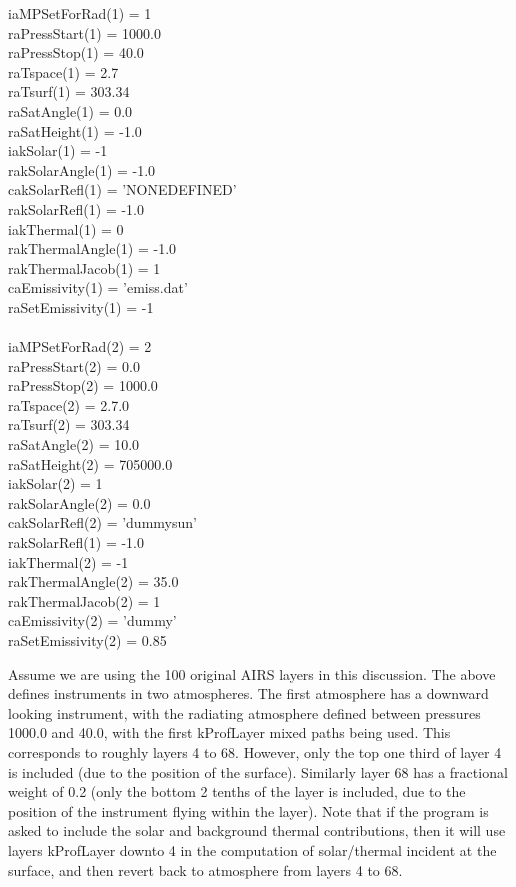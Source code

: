 \documentclass[12pt]{article}
\newcommand{\ttab}{\indent\indent}
\begin{document}
{\medskip
\ttab iaMPSetForRad(1)   = 1\\
\ttab raPressStart(1)    = 1000.0\\
\ttab raPressStop(1)     = 40.0\\
\ttab raTspace(1)        = 2.7\\
\ttab raTsurf(1)         = 303.34\\
\ttab raSatAngle(1)      = 0.0\\
\ttab raSatHeight(1)     = -1.0\\
\ttab iakSolar(1)        = -1\\
\ttab rakSolarAngle(1)   = -1.0\\
\ttab cakSolarRefl(1)    = 'NONEDEFINED'\\
\ttab rakSolarRefl(1)   = -1.0\\
\ttab iakThermal(1)      = 0\\
\ttab rakThermalAngle(1) = -1.0\\
\ttab rakThermalJacob(1) = 1\\
\ttab caEmissivity(1)    = 'emiss.dat'\\
\ttab raSetEmissivity(1) = -1\\
\ttab  \\
\ttab iaMPSetForRad(2)   = 2\\
\ttab raPressStart(2)    = 0.0\\
\ttab raPressStop(2)     = 1000.0\\
\ttab raTspace(2)        = 2.7.0\\
\ttab raTsurf(2)         = 303.34\\
\ttab raSatAngle(2)      = 10.0\\
\ttab raSatHeight(2)     = 705000.0\\
\ttab iakSolar(2)        = 1\\
\ttab rakSolarAngle(2)   = 0.0\\
\ttab cakSolarRefl(2)    = 'dummysun'\\
\ttab rakSolarRefl(1)   = -1.0\\
\ttab iakThermal(2)      = -1\\
\ttab rakThermalAngle(2) = 35.0\\
\ttab rakThermalJacob(2) = 1\\
\ttab caEmissivity(2)    = 'dummy'\\
\ttab raSetEmissivity(2) = 0.85\\
\medskip

\noindent
Assume we are using the 100 original AIRS layers in this discussion. 
The above defines instruments in two atmospheres.  The first atmosphere has a
downward looking instrument, with the radiating atmosphere defined
between pressures 1000.0 and 40.0, with the first kProfLayer mixed paths
being used.  This corresponds to roughly layers 4 to 68.  However,
only the top one third of layer 4 is included (due to the position
of the surface).  Similarly layer 68 has a fractional weight of 0.2
(only the bottom 2 tenths of the layer is included, due to the
position of the instrument flying within the layer).  Note that if
the program is asked to include the solar and background thermal
contributions, then it will use layers kProfLayer downto 4 in the
computation of solar/thermal incident at the surface, and then
revert back to atmosphere from layers 4 to 68.

}
\end{document}
